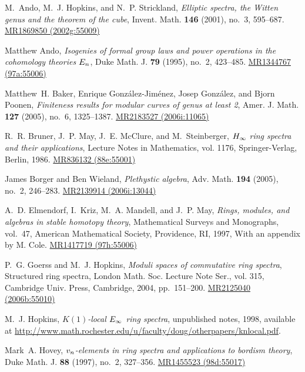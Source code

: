 \documentclass{gtpart}
\theoremstyle{definition}
\theoremstyle{remark}
\begin{document}
\newcommand{\MRn}[2]{\href{http://www.ams.org/mathscinet-getitem?mr=#1}{MR#1 #2}}
\begin{thebibliography}

M.~Ando, M.~J. Hopkins, and N.~P. Strickland, \emph{Elliptic spectra, the
  {W}itten genus and the theorem of the cube}, Invent. Math. \textbf{146}
  (2001), no.~3, 595--687. \MRn{1869850}{(2002g:55009)}

Matthew Ando, \emph{Isogenies of formal group laws and power operations in the
  cohomology theories {$E\sb n$}}, Duke Math. J. \textbf{79} (1995), no.~2,
  423--485. \MRn{1344767}{(97a:55006)}

Matthew~H. Baker, Enrique Gonz{\'a}lez-Jim{\'e}nez, Josep Gonz{\'a}lez, and
  Bjorn Poonen, \emph{Finiteness results for modular curves of genus at least
  2}, Amer. J. Math. \textbf{127} (2005), no.~6, 1325--1387. \MRn{2183527}{(2006i:11065)}

R.~R. Bruner, J.~P. May, J.~E. McClure, and M.~Steinberger, \emph{{$H\sb \infty
  $} ring spectra and their applications}, Lecture Notes in Mathematics, vol.
  1176, Springer-Verlag, Berlin, 1986. \MRn{836132}{(88e:55001)}

James Borger and Ben Wieland, \emph{Plethystic algebra}, Adv. Math.
  \textbf{194} (2005), no.~2, 246--283. \MRn{2139914}{(2006i:13044)}

A.~D. Elmendorf, I.~Kriz, M.~A. Mandell, and J.~P. May, \emph{Rings, modules,
  and algebras in stable homotopy theory}, Mathematical Surveys and Monographs,
  vol.~47, American Mathematical Society, Providence, RI, 1997, With an
  appendix by M. Cole. \MRn{1417719}{(97h:55006)}

P.~G. Goerss and M.~J. Hopkins, \emph{Moduli spaces of commutative ring
  spectra}, Structured ring spectra, London Math. Soc. Lecture Note Ser., vol.
  315, Cambridge Univ. Press, Cambridge, 2004, pp.~151--200. \MRn{2125040}{(2006b:55010)}

M.~J. Hopkins, \emph{{$K(1)$}-local {$E\sb \infty $} ring spectra}, unpublished
  notes, 1998, available at
  \url{http://www.math.rochester.edu/u/faculty/doug/otherpapers/knlocal.pdf}.

Mark~A. Hovey, \emph{{$v\sb n$}-elements in ring spectra and applications to
  bordism theory}, Duke Math. J. \textbf{88} (1997), no.~2, 327--356.
  \MRn{1455523}{(98d:55017)}


\end{thebibliography}
\end{document}
